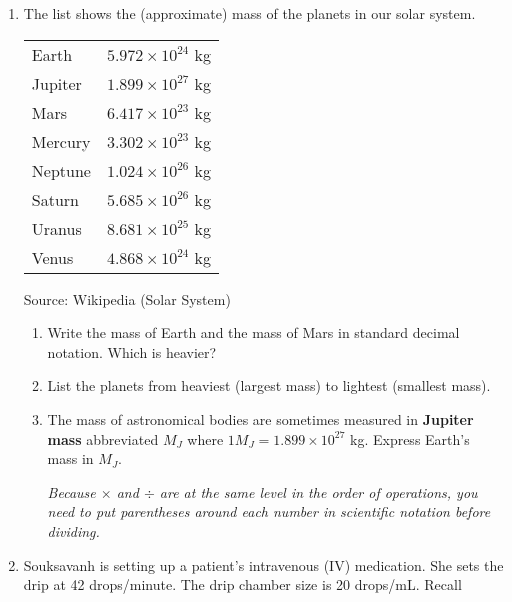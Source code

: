 \begin{enumerate}
\item The list shows the (approximate) mass of the planets in our solar system.
\begin{center}
\begin{tabular} {ll}
Earth & $5.972 \times 10^{24}$ kg \\
Jupiter &  $1.899 \times 10^{27}$ kg  \\
Mars & $6.417 \times 10^{23}$ kg \\ 
Mercury & $3.302 \times 10^{23}$ kg \\
Neptune & $1.024 \times 10^{26}$ kg \\
Saturn & $5.685 \times 10^{26}$ kg \\
Uranus & $8.681 \times 10^{25}$ kg \\
Venus & $4.868 \times 10^{24}$ kg \\ 
\end{tabular}
\end{center}
\hfill \begin{footnotesize} Source:  Wikipedia (Solar System) \end{footnotesize}
\begin{enumerate}
\item Write the mass of Earth and the mass of Mars in standard decimal notation.  Which is heavier?\vfill
\item List the planets from heaviest (largest mass) to lightest (smallest mass).\vfill 
\item The mass of astronomical bodies are sometimes measured in \textbf{Jupiter mass} abbreviated $M_J$ where $1 M_J = 1.899 \times 10^{27}$ kg.  Express Earth's mass in $M_J$.

 \emph{Because $\times$ and $\div$ are at the same level in the order of operations, you need to put parentheses around each number in scientific notation before dividing.} \vfill
\end{enumerate}

\newpage %

\item Souksavanh is setting up a patient's intravenous (IV) medication. She sets the drip at 42 drops/minute.  The drip chamber size is 20 drops/mL.  Recall


\end{enumerate}
